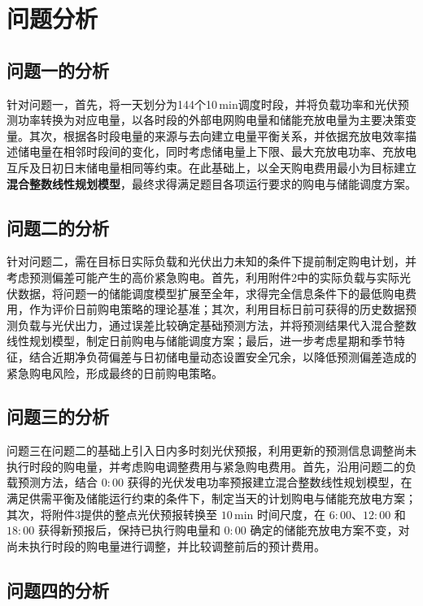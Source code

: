 \section{问题分析}

\subsection{问题一的分析}

针对问题一，首先，将一天划分为144个10\,min调度时段，并将负载功率和光伏预测功率转换为对应电量，以各时段的外部电网购电量和储能充放电量为主要决策变量。其次，根据各时段电量的来源与去向建立电量平衡关系，并依据充放电效率描述储电量在相邻时段间的变化，同时考虑储电量上下限、最大充放电功率、充放电互斥及日初日末储电量相同等约束。在此基础上，以全天购电费用最小为目标建立\textbf{混合整数线性规划模型}，最终求得满足题目各项运行要求的购电与储能调度方案。



\subsection{问题二的分析}

针对问题二，需在目标日实际负载和光伏出力未知的条件下提前制定购电计划，并考虑预测偏差可能产生的高价紧急购电。首先，利用附件2中的实际负载与实际光伏数据，将问题一的储能调度模型扩展至全年，求得完全信息条件下的最低购电费用，作为评价日前购电策略的理论基准；其次，利用目标日前可获得的历史数据预测负载与光伏出力，通过误差比较确定基础预测方法，并将预测结果代入混合整数线性规划模型，制定日前购电与储能调度方案；最后，进一步考虑星期和季节特征，结合近期净负荷偏差与日初储电量动态设置安全冗余，以降低预测偏差造成的紧急购电风险，形成最终的日前购电策略。

\subsection{问题三的分析}

问题三在问题二的基础上引入日内多时刻光伏预报，利用更新的预测信息调整尚未执行时段的购电量，并考虑购电调整费用与紧急购电费用。首先，沿用问题二的负载预测方法，结合 $0{:}00$ 获得的光伏发电功率预报建立混合整数线性规划模型，在满足供需平衡及储能运行约束的条件下，制定当天的计划购电与储能充放电方案；其次，将附件3提供的整点光伏预报转换至 $10\,\mathrm{min}$ 时间尺度，在 $6{:}00$、$12{:}00$ 和 $18{:}00$ 获得新预报后，保持已执行购电量和 $0{:}00$ 确定的储能充放电方案不变，对尚未执行时段的购电量进行调整，并比较调整前后的预计费用。


\subsection{问题四的分析}

